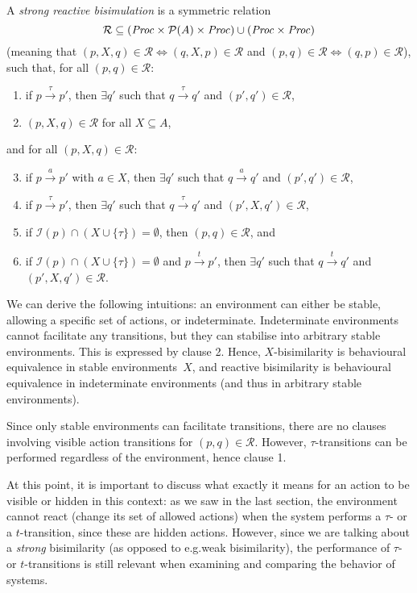 \begin{isabellebody}
\begin{isamarkuptext}
A \emph{strong reactive bisimulation} is a symmetric relation 
$$\mathcal{R} \subseteq (\mathit{Proc} \times \mathcal{P}(A) \times \mathit{Proc}) \cup (\mathit{Proc} \times \mathit{Proc})$$
(meaning that $(p,X,q)\!\in\!\mathcal{R}\!\iff\!(q,X,p)\!\in\!\mathcal{R}$ and
$(p,q)\!\in\!\mathcal{R}\!\iff\!(q,p)\!\in\!\mathcal{R}$),\\
such that,
\newpage
for all $(p,q) \in \mathcal{R}$:
\begin{enumerate}
    \item if $p \xrightarrow{\tau} p'$, then $\exists q'$ such that $q \xrightarrow{\tau} q'$ and $(p',q') \in \mathcal{R}$,
    \item $(p,X,q) \in \mathcal{R}$ for all $X \subseteq A$,
\end{enumerate}
and for all $(p,X,q) \in \mathcal{R}$:
\begin{enumerate}
    \setcounter{enumi}{2}
    \item if $p \xrightarrow{a} p'$ with $a \in X$, then $\exists q'$ such that $q \xrightarrow{a} q'$ and $(p',q') \in \mathcal{R}$,
    \item if $p \xrightarrow{\tau} p'$, then $\exists q'$ such that $q \xrightarrow{\tau} q'$ and $(p',X,q') \in \mathcal{R}$,
    \item if $\mathcal{I}(p) \cap (X \cup \{\tau\}) = \emptyset$, then $(p,q) \in \mathcal{R}$, and
    \item if $\mathcal{I}(p) \cap (X \cup \{\tau\}) = \emptyset$ and $p \xrightarrow{t} p'$, then $\exists q'$ such that $q \xrightarrow{t} q'$ and $(p',X,q') \in \mathcal{R}$.
\end{enumerate}

We can derive the following intuitions: an environment can either be stable, allowing a specific set of actions, or indeterminate. Indeterminate environments cannot facilitate any transitions, but they can stabilise into arbitrary stable environments. This is expressed by clause 2. Hence, $X$-bisimilarity is behavioural equivalence in stable environments~$X$, and reactive bisimilarity is behavioural equivalence in indeterminate environments (and thus in arbitrary stable environments).

Since only stable environments can facilitate transitions, there are no clauses involving visible action transitions for $(p,q) \in \mathcal{R}$. However, $\tau$-transitions can be performed regardless of the environment, hence clause 1.

At this point, it is important to discuss what exactly it means for an action to be visible or hidden in this context: as we saw in the last section, the environment cannot react (change its set of allowed actions) when the system performs a $\tau$- or a $t$-transition, since these are hidden actions. However, since we are talking about a \emph{strong} bisimilarity (as opposed to e.g.\@ weak bisimilarity), the performance of $\tau$- or $t$-transitions is still relevant when examining and comparing the behavior of systems.


\end{isamarkuptext}
\end{isabellebody}
